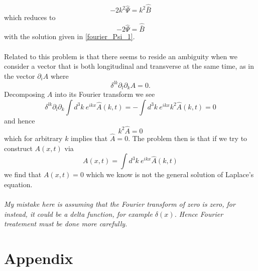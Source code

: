 \documentclass[10pt,letterpaper]{article}
\newcommand{\be}{\begin{equation}} %
\newcommand{\ee}{\end{equation}} %
\newcommand{\pd}{\partial}
\numberwithin{equation}{section}
\begin{document}
\be
	-2k^2 \hat \Psi = k^2 \hat{\bar B}
\ee
which reduces to
\be
	-2\hat \Psi = \hat{\bar B}
\ee
with the solution given in \ref{fourier_Psi_1}.
\\
\\
Related to this problem is that there seems to reside an ambiguity when we consider a vector that is both longitudinal and transverse at the same time, as in the vector $\pd_i A$ where 
\be
	 \delta^{lk}\pd_l\pd_k A = 0.
\ee
Decomposing $A$ into its Fourier transform we see
\be
	 \delta^{lk}\pd_l\pd_k \int d^3k\ e^{ikx} \hat A(k,t) = -\int d^3k\ e^{ikx} k^2 \hat A(k,t) =0
\ee
and hence
\be
	k^2 \hat A = 0
\ee
which for arbitrary $k$ implies that $\hat A = 0$. The problem then is that if we try to construct $A(x,t)$ via
\be
	A(x,t) = \int d^3k\ e^{ikx}\hat A(k,t)
\ee
we find that $A(x,t) =0$ which we know is not the general solution of Laplace's equation.\\ \\
\emph{ My mistake here is assuming that the Fourier transform of zero is zero, for instead, it could be a delta function, for example $\delta(x)$. Hence Fourier treatement must be done more carefully. }
\appendix
\newpage
\section{Appendix}
\end{document}
